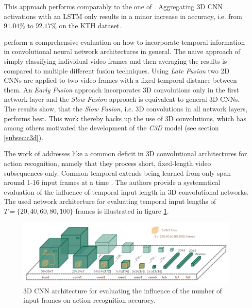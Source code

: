 This approach performs comparably to the one of \textcite{ji_3d_2013}.
Aggregating 3D CNN activations with an LSTM only results in a minor increase in accuracy, i.e. from $91.04\%$ to $92.17\%$ on the KTH dataset\cite{schuldt_recognizing_2004}.

\textcite{karpathy_large-scale_2014} perform a comprehensive evaluation on how to incorporate temporal information in convolutional neural network architectures in general.
The naive approach of simply classifying individual video frames and then averaging the results is compared to multiple different fusion techniques.
Using \textit{Late Fusion} two 2D CNNs are applied to two video frames with a fixed temporal distance between them.
An \textit{Early Fusion} approach incorporates 3D convolutions only in the first network layer and the \textit{Slow Fusion} approach is equivalent to general 3D CNNs.
The results show, that the \textit{Slow Fusion}, i.e. 3D convolutions in all network layers, performs best.
This work thereby backs up the use of 3D convolutions, which has among others motivated the development of the \textit{C3D} model (see section \ref{subsec:c3d}).

The work of \textcite{varol_long-term_2016} addresses like \textcite{baccouche_sequential_2011} a common deficit in 3D convolutional architectures for action recognition, namely that they process short, fixed-length video subsequences only.
Common temporal extends being learned from only span around 1-16 input frames at a time \cite{ji_3d_2013}\cite{karpathy_large-scale_2014}\cite{tran_learning_2015}.
The authors provide a systematical evaluation of the influence of temporal input length in 3D convolutional networks.
The used network architecture for evaluating temporal input lengths of $T = \{20, 40, 60, 80, 100\}$ frames is illustrated in figure \ref{fig:longterm_architecture}.

\begin{figure}[H]
    \centering
    \includegraphics[width=\textwidth]{img_related/longterm_architecture}
    \caption{3D CNN architecture for evaluating the influence of the number of input frames on action recognition accuracy. \cite{varol_long-term_2016}}
    \label{fig:longterm_architecture}
\end{figure}

